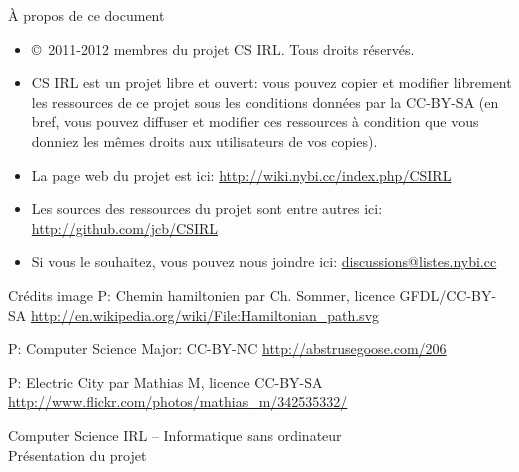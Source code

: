 \documentclass[final,hyperref={pdfpagelabels=false}]{beamer}
\renewenvironment{Coupe}{   }{   }
\renewcommand*{\footnotesize}{\fontsize{\resultfootnotesizeX}{\resultfootnotesizeY}\selectfont}
\renewcommand*{\normalsize}{\fontsize{\resultnormalsizeX}{\resultnormalsizeY}\selectfont}
\renewcommand*{\large}{\fontsize{\resultlargeX}{\resultlargeY}\selectfont}
\begin{document}
\begin{Coupe}
\begin{frame}{}
  
\end{frame}

\begin{frame}
  \vspace{20\baselineskip}
  \vfill
  \begin{block}{À propos de ce document}
    \begin{itemize}
    \item \copyright\ 2011-2012 membres du projet CS IRL. Tous droits réservés.

    \item CS IRL est un \alert{projet libre et ouvert}: vous pouvez copier et
      modifier librement les ressources de ce projet sous les conditions
      données par la CC-BY-SA (en bref, vous pouvez diffuser et modifier ces
      ressources à condition que vous donniez les mêmes droits aux utilisateurs
      de vos copies).
    \item La page web du projet est ici: \url{http://wiki.nybi.cc/index.php/CSIRL}
    \item Les sources des ressources du projet sont entre autres ici: \url{http://github.com/jcb/CSIRL}
    \item Si vous le souhaitez, vous pouvez nous joindre ici: \url{discussions@listes.nybi.cc}
    \end{itemize}
  \end{block}

  \begin{block}{\normalsize Crédits image}\footnotesize
    P\pageref{img:hamiltonian}: Chemin hamiltonien par Ch. Sommer,
    licence GFDL/CC-BY-SA
    \url{http://en.wikipedia.org/wiki/File:Hamiltonian_path.svg}

    P\pageref{img:CSmajor}: Computer Science Major: CC-BY-NC
    \url{http://abstrusegoose.com/206}


    P\pageref{img:electric:city}: Electric City par Mathias M, licence CC-BY-SA
    \url{http://www.flickr.com/photos/mathias_m/342535332/}
  \end{block}
\end{frame}
\begin{frame}{Computer Science IRL -- Informatique sans ordinateur\\[-5pt]
  {\large Présentation du projet}}


\end{frame}
\end{Coupe}
\end{document}

